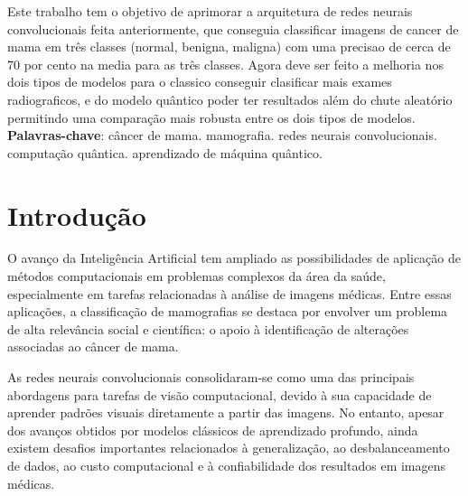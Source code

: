 \documentclass[
    12pt,
    openright,
    oneside,
    a4paper,
    english,
    brazil
]{abntex2}
\begin{document}
\frenchspacing

\pretextual
\imprimircapa
\imprimirfolhaderosto

\begin{resumo}

Este trabalho tem o objetivo de aprimorar a arquitetura de redes neurais convolucionais feita anteriormente, que conseguia classificar imagens de cancer de mama em três classes (normal, benigna, maligna) com uma precisao de cerca de 70 por cento na media para as três classes. Agora deve ser feito a melhoria nos dois tipos de modelos para o classico conseguir clasificar mais exames radiograficos, e do modelo quântico poder ter resultados além do chute aleatório permitindo uma comparação mais robusta entre os dois tipos de modelos. 
\vspace{\onelineskip}
\noindent
\textbf{Palavras-chave}: câncer de mama. mamografia. redes neurais convolucionais. computação quântica. aprendizado de máquina quântico.
\end{resumo}

\tableofcontents*
\cleardoublepage

\textual



\chapter{Introdução}

O avanço da Inteligência Artificial tem ampliado as possibilidades de aplicação de métodos computacionais em problemas complexos da área da saúde, especialmente em tarefas relacionadas à análise de imagens médicas. Entre essas aplicações, a classificação de mamografias se destaca por envolver um problema de alta relevância social e científica: o apoio à identificação de alterações associadas ao câncer de mama.

As redes neurais convolucionais consolidaram-se como uma das principais abordagens para tarefas de visão computacional, devido à sua capacidade de aprender padrões visuais diretamente a partir das imagens. No entanto, apesar dos avanços obtidos por modelos clássicos de aprendizado profundo, ainda existem desafios importantes relacionados à generalização, ao desbalanceamento de dados, ao custo computacional e à confiabilidade dos resultados em imagens médicas.
\end{document}
